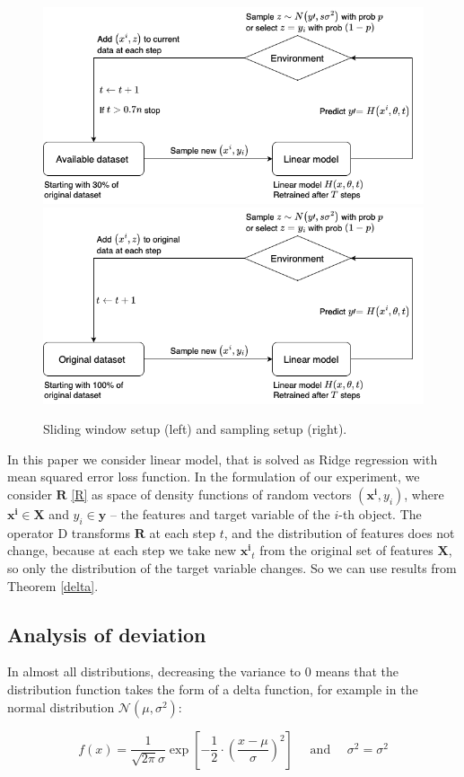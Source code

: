 \documentclass{article}
\begin{document}
        \begin{figure}[h!]
            \centering
            \includegraphics[width=0.49\linewidth]{pictures/Hidden_loop.png}
            \includegraphics[width=0.49\linewidth]{pictures/Hidden_sample.png}
            
            \caption{Sliding window setup (left) and sampling setup (right).}
            \label{ex_set}
        \end{figure}

        In this paper we consider linear model, that is solved as Ridge regression with mean squared error loss function. In the formulation of our experiment, we consider $\mathbf{R}$ \eqref{R} as space of density functions of random vectors $(\mathbf{x^i}, y_i)$, where $\mathbf{x^i} \in \textbf{X}$ and $y_i \in \textbf{y}$ -- the features and target variable of the $i$-th object. The operator $\text{D}$ transforms $\mathbf{R}$ at each step $t$, and the distribution of features does not change, because at each step we take new $\mathbf{x^i}_t$ from the original set of features $\textbf{X}$, so only the distribution of the target variable changes. So we can use results from Theorem \ref{delta}. 

    \subsection{Analysis of deviation} \label{exp_1}

        In almost all distributions, decreasing the variance to 0 means that the distribution function takes the form of a delta function, for example in the normal distribution $\mathcal{N}(\mu, \sigma^2)$:

        \begin{equation*}
            f(x) = \dfrac{1}{\sqrt{2 \pi} \sigma} \exp\left[-\dfrac{1}{2} \cdot \left(\dfrac{x - \mu}{\sigma}\right)^2\right] \quad \text{ and } \quad \sigma^2 = \sigma^2
        \end{equation*}
\end{document}
